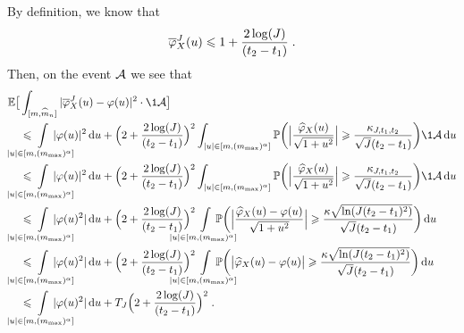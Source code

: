 By definition, we know that
    $$ \overline \varphi_X^J(u) \leqslant 1 + \frac{2 \log(J)}{(t_2 - t_1)}\; .$$
Then, on the event $\mathcal{A}$
we see that 
        \begin{align*}
         \EE \big[ & \int_{[m, \hat m_n]} |\bar \varphi_X^J(u)  - \varphi(u)|^2 \cdot \1{\Acal} \big] 
         \\
         & 
         \leq
         \hspace{-0.8cm}
         \int\limits_{|u| \in [m, (\mmax)^\alpha]} \hspace{-0.8cm}
         |\varphi(u)|^2 \du + \Big(2 + \frac{2 \log(J)}{(t_2 - t_1)}\Big)^2 
         \int_{|u| \in [m, (\mmax)^\alpha]} 
         \PP \bigg( \Big|\frac{ \hat \varphi_X(u)}{\sqrt{1 + u^2}}  \Big| \geq \frac{\kappa_{J, t_1, t_2}}{\sqrt{J}(t_2 - t_1)} \bigg)\1{\Acal} \du \\
         & 
         \leq
         \hspace{-0.8cm}
         \int\limits_{|u| \in [m, (\mmax)^\alpha]}
         \hspace{-0.8cm}|\varphi(u)|^2 \du + \Big(2 + \frac{2 \log(J)}{(t_2 - t_1)}\Big)^2 
         \int_{|u| \in [m, (\mmax)^\alpha]} 
         \PP \bigg( \Big|\frac{ \hat \varphi_X(u)}{\sqrt{1 + u^2}}  \Big| \geq \frac{\kappa_{J, t_1, t_2}}{\sqrt{J}(t_2 - t_1)} \bigg) \1{\Acal} \du\\
         &
         \leq
         \hspace{-0.8cm}
         \int\limits_{|u| \in [m, (\mmax)^\alpha]} 
         \hspace{-0.8cm}|\varphi(u)^2| \du + \Big(2 + \frac{2 \log(J)}{(t_2 - t_1)}\Big)^2 
         \hspace{-0.8cm}\int\limits_{|u| \in [m, (\mmax)^\alpha]} \hspace{-0.8cm}
         \PP \bigg( \Big|\frac{ \hat \varphi_X(u) - \varphi(u)}{\sqrt{1 + u^2}}  \Big| \geq \frac{\kappa \sqrt{\ln(J(t_2 - t_1)^2)}}{\sqrt{J}(t_2 - t_1)}\bigg) \du \\ 
         &
         \leq
         \hspace{-0.8cm}
         \int\limits_{|u| \in [m, (\mmax)^\alpha]}
         \hspace{-0.8cm}|\varphi(u)^2| \du + \Big(2 + \frac{2 \log(J)}{(t_2 - t_1)}\Big)^2 \hspace{-0.8cm}
         \int\limits_{|u| \in [m, (\mmax)^\alpha]} \hspace{-0.8cm}
         \PP \bigg( \big| \hat \varphi_X(u) - \varphi(u)  \big| \geq \frac{\kappa \sqrt{\ln(J(t_2 - t_1)^2)}}{\sqrt{J}(t_2 - t_1)}\bigg) \du \\ 
         &
         \leq
         \hspace{-0.8cm}
         \int\limits_{|u| \in [m, (\mmax)^\alpha]} 
         \hspace{-0.8cm}
         |\varphi(u)^2| \du +  T_J \Big(2 + \frac{2 \log(J)}{(t_2 - t_1)}\Big)^2
         \eqfinp
    \end{align*}
    
